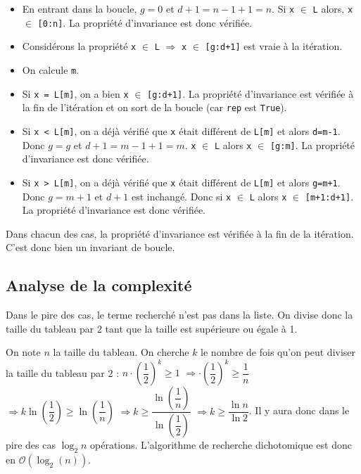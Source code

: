\begin{itemize}
\item En entrant dans la boucle, $g=0$ et $d+1=n-1+1=n$. Si \lstinline{x} $\in$ \lstinline{L} alors, \lstinline{x} $\in$ \lstinline{[0:n]}. La propriété d'invariance est donc vérifiée.

\item Considérons la propriété 
\lstinline{x} $\in$ \lstinline{L} $\Rightarrow$ \lstinline{x} $\in$ \lstinline{[g:d+1]}
est vraie à la \ieme itération.

\item On calcule \lstinline{m}.

\item Si \lstinline{x = L[m]}, on a bien \lstinline{x} $\in$ \lstinline{[g:d+1]}. La propriété d'invariance est vérifiée à la fin de l'itération et on sort de la boucle (car \lstinline{rep} est \lstinline{True}). 

\item Si \lstinline{x < L[m]}, on a déjà vérifié que \lstinline{x} était différent de \lstinline{L[m]} et alors \lstinline{d=m-1}. Donc $g=g$ et $d+1=m-1+1=m$.
\lstinline{x} $\in$ \lstinline{L} alors \lstinline{x} $\in$ \lstinline{[g:m]}. La propriété d'invariance est donc vérifiée.

\item Si \lstinline{x > L[m]}, on a déjà vérifié que \lstinline{x} était différent de \lstinline{L[m]} et alors \lstinline{g=m+1}. Donc $g=m+1$ et $d+1$ est inchangé.
 Donc si 
\lstinline{x} $\in$ \lstinline{L} alors \lstinline{x} $\in$ \lstinline{[m+1:d+1]}. La propriété d'invariance est donc vérifiée.
\end{itemize}
Dans chacun des cas, la propriété d'invariance est vérifiée à la fin de la \ieme itération. C'est donc bien un invariant de boucle. 

\subsection{Analyse de la complexité}
Dans le pire des cas, le terme recherché n'est pas dans la liste. On divise donc la taille du tableau par 2 tant que la taille est supérieure ou égale à 1. 

On note $n$ la taille du tableau. On cherche $k$ le nombre de fois qu'on peut diviser la taille du tableau par 2 : 
$n\cdot\left(\dfrac{1}{2}\right)^k \geq 1$ 
$\Rightarrow \cdot\left(\dfrac{1}{2}\right)^k \geq \dfrac{1}{n}$
$\Rightarrow k \ln\left(\dfrac{1}{2}\right) \geq \ln\left(\dfrac{1}{n}\right)$
$\Rightarrow k \geq \dfrac{\ln\left(\dfrac{1}{n}\right)}{\ln\left(\dfrac{1}{2}\right)}$
$\Rightarrow k \geq \dfrac{\ln n}{\ln 2}$.
Il y aura donc dans le pire des cas $\log_2 n$ opérations.  L'algorithme de recherche dichotomique est donc en $\mathcal{O}(\log_2(n))$.

